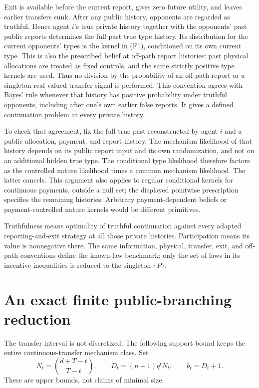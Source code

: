\documentclass[11pt,a4paper]{article}
\begin{document}
Exit is available before the current report, gives zero future utility,
and leaves earlier transfers sunk. After any public history, opponents
are regarded as truthful. Hence agent $i$'s true private history together
with the opponents' past public reports determines the full past true
type history. Its distribution for the current opponents' types is the
kernel in \textup{(F1)}, conditioned on its own current type. This is also
the prescribed belief at off-path report histories: past physical
allocations are treated as fixed controls, and the same strictly positive
type kernels are used. Thus no division by the probability of an
off-path report or a singleton real-valued transfer signal is performed.
This convention agrees with Bayes' rule whenever that history has
positive probability under truthful opponents, including after one's
own earlier false reports. It gives a defined continuation problem at
every private history.

To check that agreement, fix the full true past reconstructed by agent
$i$ and a public allocation, payment, and report history. The mechanism
likelihood of that history depends on its public report input and its
own randomization, and not on an additional hidden true type. The
conditional type likelihood therefore factors as the controlled nature
likelihood times a common mechanism likelihood. The latter cancels.
This argument also applies to regular conditional kernels for continuous
payments, outside a null set; the displayed pointwise prescription
specifies the remaining histories. Arbitrary payment-dependent beliefs
or payment-controlled nature kernels would be different primitives.

Truthfulness means optimality of truthful continuation against every
adapted reporting-and-exit strategy at all those private histories.
Participation means its value is nonnegative there. The same information,
physical, transfer, exit, and off-path conventions define the known-law
benchmark; only the set of laws in its incentive inequalities is reduced
to the singleton $\{P\}$.

\section{An exact finite public-branching reduction}
\label{sec:compression}

The transfer interval is not discretized. The following support bound
keeps the entire continuous-transfer mechanism class.
Set
\[
 N_t=\binom{d+T-t}{T-t},\qquad
 D_t=(n+1)q^tN_t,\qquad b_t=D_t+1.
 \tag{F2}
\]
These are upper bounds, not claims of minimal size.
\end{document}
